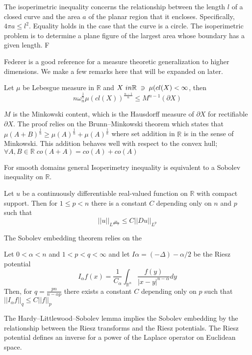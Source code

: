 The isoperimetric inequality concerns the relationship between the length $l$ of a closed curve and the area $a$ of the planar region that it encloses.  Specifically, $4 \pi a \leq l^2$.  Equality holds in the case that the curve is a circle. The isoperimetric problem is to determine a plane figure of the largest area whose boundary has a given length. F

Federer \cite{federer1996geometric} is a good reference for a measure theoretic generalization to higher dimensions. We make a few remarks here that will be expanded on later.
\begin{prop}
Let $\mu$ be Lebesgue measure in $\mathbb{R}$ and $X \ in \mathbb{R} \; \ni \; \mu(cl(X) < \infty$, then
\begin{equation*}
  n \omega^{\frac{1}{n}}_{n} \mu(cl(X))^{\frac{n-1}{n}} \leq M^{n-1}(\partial X)
\end{equation*}
\end{prop}
$M$ is the Minkowski content, which is  the Hausdorff measure of $\partial X$ for rectifiable $\partial X$.
The proof relies on the Brunn–Minkowski theorem which states that $\mu(A+B)^{\frac{1}{n}} \geq \mu(A)^{\frac{1}{n}} + \mu(A)^{\frac{1}{n}}$ where set addition in $\mathbb{R}$ is in the sense of Minkowski.  This addition behaves well with respect to the convex hull; $\forall A,B \in \mathbb{R} \; co(A + A) = co(A) + co(A)$

For smooth domains general Isoperimetry inequality is equivalent to a Sobolev inequality on $\mathbb{R}$.

\begin{prop}
Let $u$ be a continuously differentiable real-valued function on $\mathbb{R}$ with compact support. Then for $1 ≤ p < n$ there is a constant $C$ depending only on $n$ and $p$ such that
\begin{equation*}
  ||u||_{L^{\frac{pn}{n-p}}} \leq C || Du||_{L^p}
\end{equation*}
\end{prop}

The Sobolev embedding theorem relies on the
\begin{thm}
Let $0 < \alpha <n$ and $1 < p  < q < \infty$ and let $I\alpha = (−\Delta)−\alpha/2$ be the Riesz potential
\begin{equation*}
  I_\alpha f(x) = \frac{1}{C_\alpha}\int_{\mathbb{R}^n} \frac{f(y)}{|x-y|^{n-\alpha}} dy
\end{equation*}
Then, for $q=\frac{pn}{n-\alpha p}$
there exists a constant $C$ depending only on $p$ such that $||I_\alpha f||_q \leq C ||f||_p$
\end{thm}
The Hardy–Littlewood–Sobolev lemma implies the Sobolev embedding by the relationship between the Riesz transforms and the Riesz potentials.  The Riesz potential defines an inverse for a power of the Laplace operator on Euclidean space.


